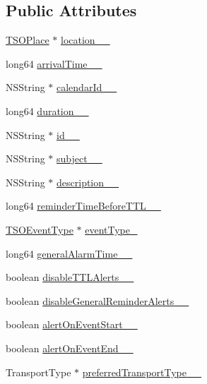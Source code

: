 \subsection*{Public Attributes}
\begin{DoxyCompactItemize}
\item 
\hyperlink{interface_t_s_o_place}{T\+S\+O\+Place} $\ast$ \hyperlink{interface_base_event___base_event_builder_a55905b025d81ae9d311245a928f2540f}{location\+\_\+\+\_\+}
\item 
long64 \hyperlink{interface_base_event___base_event_builder_a07d8a66c012266d58ec5ae0c0c718ee4}{arrival\+Time\+\_\+\+\_\+}
\item 
N\+S\+String $\ast$ \hyperlink{interface_base_event___base_event_builder_a04f9a35d40886b62889953b23028f3c0}{calendar\+Id\+\_\+\+\_\+}
\item 
long64 \hyperlink{interface_base_event___base_event_builder_a90e45c0eafd631d21a8dedd1c43386a5}{duration\+\_\+\+\_\+}
\item 
N\+S\+String $\ast$ \hyperlink{interface_base_event___base_event_builder_a92d8b6477391ecdc15f4f588a68f2b3a}{id\+\_\+\+\_\+}
\item 
N\+S\+String $\ast$ \hyperlink{interface_base_event___base_event_builder_a822ac0d667b96e331b26688b658d8b69}{subject\+\_\+\+\_\+}
\item 
N\+S\+String $\ast$ \hyperlink{interface_base_event___base_event_builder_a7467b18b840a94c90419132dbcc9d1a2}{description\+\_\+\+\_\+}
\item 
long64 \hyperlink{interface_base_event___base_event_builder_aa564be1f9fcf028ced1ed7f0c763177a}{reminder\+Time\+Before\+T\+T\+L\+\_\+\+\_\+}
\item 
\hyperlink{interface_t_s_o_event_type}{T\+S\+O\+Event\+Type} $\ast$ \hyperlink{interface_base_event___base_event_builder_a1c1fc671b49490343f8ea7a7ba6df0eb}{event\+Type\+\_\+}
\item 
long64 \hyperlink{interface_base_event___base_event_builder_ad15807b5cd4a3257dde0e088b564abdc}{general\+Alarm\+Time\+\_\+\+\_\+}
\item 
boolean \hyperlink{interface_base_event___base_event_builder_a9e9f6ba0969df4433fadb3d52d37923d}{disable\+T\+T\+L\+Alerts\+\_\+\+\_\+}
\item 
boolean \hyperlink{interface_base_event___base_event_builder_aa262087a880c367a03b0e9743b870564}{disable\+General\+Reminder\+Alerts\+\_\+\+\_\+}
\item 
boolean \hyperlink{interface_base_event___base_event_builder_ad9a37628ef891a242199695aaf51443e}{alert\+On\+Event\+Start\+\_\+\+\_\+}
\item 
boolean \hyperlink{interface_base_event___base_event_builder_aa83342ff0ed506d05a083b3172602078}{alert\+On\+Event\+End\+\_\+\+\_\+}
\item 
Transport\+Type $\ast$ \hyperlink{interface_base_event___base_event_builder_af04f5589c9d88f57e6b17807b4dafa64}{preferred\+Transport\+Type\+\_\+\+\_\+}
\end{DoxyCompactItemize}


